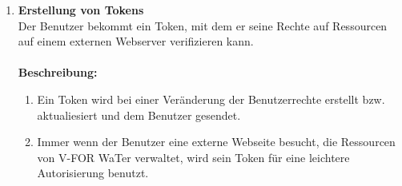 \documentclass[parskip=full,11pt]{scrartcl}
\def\threedigits#1{%
  \ifnum#1<10 0\fi
  \ifnum#1<1 0\fi
  \number#1}
\begin{document}
\begin{enumerate}[label={\textbf{/F\protect\threedigits{\theenumi}0/}}, leftmargin=*]
\item \label{FAB10} \colorbox{shadecolor}{\textbf{Erstellung von Tokens}}\\ Der Benutzer bekommt ein Token, mit dem er seine Rechte auf Ressourcen auf einem externen Webserver verifizieren kann.\\\\
\textbf{Beschreibung:}\\
\begin{enumerate}[label=(\arabic*), leftmargin=*]
\item Ein Token wird bei einer Veränderung der Benutzerrechte erstellt bzw. aktualiesiert und dem Benutzer gesendet. 
\item Immer wenn der Benutzer eine externe Webseite besucht, die Ressourcen von V-FOR WaTer verwaltet, wird sein Token für eine leichtere Autorisierung benutzt. 

\end{enumerate}

\end{enumerate}
\end{document}
